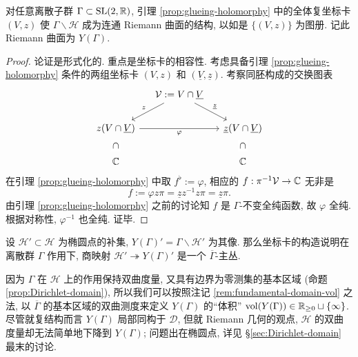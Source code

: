 \begin{definition-theorem}\label{prop:Y-chart} 
	对任意离散子群 $\Gamma \subset \operatorname{SL}(2,\mathbb{R})$, 引理 \ref{prop:glueing-holomorphy} 中的全体复坐标卡 $(V,z)$ 使 $\Gamma \backslash \mathcal{H}$ 成为连通 Riemann 曲面的结构, 以如是 $\{(V,z)\}$ 为图册. 记此 Riemann 曲面为 $Y(\Gamma)$.
\end{definition-theorem}
\begin{proof}
	论证是形式化的. 重点是坐标卡的相容性. 考虑具备引理 \ref{prop:glueing-holomorphy} 条件的两组坐标卡 $(V, z)$ 和 $(\underline{V}, \underline{z})$. 考察同胚构成的交换图表
	\[\begin{tikzcd}[column sep=small]
		& \mathcal{V} := V \cap \underline{V}  \arrow[ld, "z"'] \arrow[rd, "\underline{z}"] & \\
		z(V \cap \underline{V}) \arrow[rr, "\varphi"'] \arrow[phantom, d, "\subset" description, sloped] & & \underline{z}(V \cap \underline{V}) \arrow[phantom, d, "\subset" description, sloped] \\
		\CC & & \CC
	\end{tikzcd}\]
	在引理 \ref{prop:glueing-holomorphy} 中取 $f^\flat := \varphi$, 相应的 $f: \pi^{-1}\mathcal{V} \to \mathbb{C}$ 无非是
	\[ f := \varphi z \pi = \underline{z} z^{-1} z \pi = \underline{z} \pi. \]
	由引理 \ref{prop:glueing-holomorphy} 之前的讨论知 $f$ 是 $\Gamma$-不变全纯函数, 故 $\varphi$ 全纯. 根据对称性, $\varphi^{-1}$ 也全纯. 证毕.
\end{proof}

\begin{remark}
	设 $\mathcal{H}' \subset \mathcal{H}$ 为椭圆点的补集, $Y(\Gamma)' = \Gamma \backslash \mathcal{H}'$ 为其像. 那么坐标卡的构造说明在离散群 $\Gamma$ 作用下, 商映射 $\mathcal{H}' \twoheadrightarrow Y(\Gamma)'$ 是一个 $\overline{\Gamma}$-主丛.
\end{remark}

\begin{remark}\label{rem:Y-metric}
	因为 $\Gamma$ 在 $\mathcal{H}$ 上的作用保持双曲度量, 又具有边界为零测集的基本区域 (命题 \ref{prop:Dirichlet-domain}), 所以我们可以按照注记 \ref{rem:fundamental-domain-vol} 之法, 以 $\overline{\Gamma}$ 的基本区域的双曲测度来定义 $Y(\Gamma)$ 的``体积'' $\operatorname{vol}(Y(\Gamma)) \in \mathbb{R}_{\geq 0} \sqcup \{\infty\}$. 尽管就复结构而言 $Y(\Gamma)$ 局部同构于 $\mathcal{D}$, 但就 Riemann 几何的观点, $\mathcal{H}$ 的双曲度量却无法简单地下降到 $Y(\Gamma)$; 问题出在椭圆点, 详见 \S\ref{sec:Dirichlet-domain} 最末的讨论.
\end{remark}

